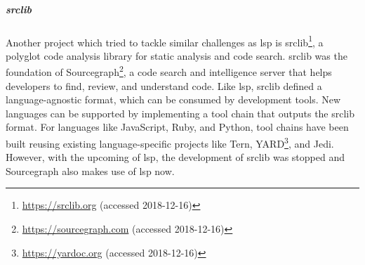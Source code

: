     \subparagraph{srclib}
    Another project which tried to tackle similar challenges as \ac{lsp} is srclib\footnote{\url{https://srclib.org} (accessed 2018-12-16)}, a polyglot code analysis library for static analysis and code search. srclib was the foundation of Sourcegraph\footnote{\url{https://sourcegraph.com} (accessed 2018-12-16)}, a code search and intelligence server that helps developers to find, review, and understand code. Like \ac{lsp}, srclib defined a language-agnostic format, which can be consumed by development tools. New languages can be supported by implementing a tool chain that outputs the srclib format. For languages like JavaScript, Ruby, and Python, tool chains have been built reusing existing language-specific projects like Tern, YARD\footnote{\url{https://yardoc.org} (accessed 2018-12-16)}, and Jedi. However, with the upcoming of \ac{lsp}, the development of srclib was stopped and Sourcegraph also makes use of \ac{lsp} now.

